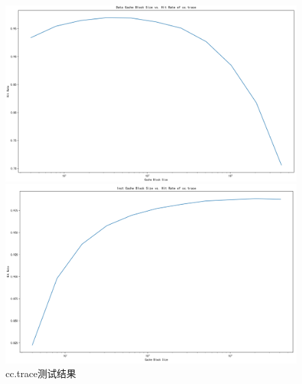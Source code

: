 \documentclass[12pt,hyperref,a4paper,UTF8]{ctexart}
\begin{document}
\begin{figure}[H]
    \centering
    \begin{minipage}[b]{0.45\textwidth}
        \centering
        \includegraphics[width=\textwidth]{./figures/fig/image23.png}
    \end{minipage}
    \hfill
    \begin{minipage}[b]{0.45\textwidth}
        \centering
        \includegraphics[width=\textwidth]{./figures/fig/image24.png}
    \end{minipage}
    \caption{cc.trace测试结果}
\end{figure}
\end{document}
